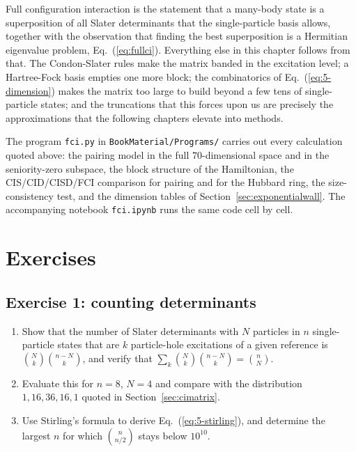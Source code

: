 Full configuration interaction is the statement that a many-body state is a
superposition of all Slater determinants that the single-particle basis
allows, together with the observation that finding the best superposition is a
Hermitian eigenvalue problem, Eq.~(\ref{eq:fullci}).  Everything else in this
chapter follows from that.  The Condon-Slater rules make the matrix banded in
the excitation level; a Hartree-Fock basis empties one more block; the
combinatorics of Eq.~(\ref{eq:5-dimension}) makes the matrix too large to
build beyond a few tens of single-particle states; and the truncations that
this forces upon us are precisely the approximations that the following
chapters elevate into methods.

The program \texttt{fci.py} in \texttt{BookMaterial/Programs/} carries out
every calculation quoted above: the pairing model in the full
$70$-dimensional space and in the seniority-zero subspace, the block structure
of the Hamiltonian, the CIS/CID/CISD/FCI comparison for pairing and for the
Hubbard ring, the size-consistency test, and the dimension tables of
Section~\ref{sec:exponentialwall}.  The accompanying notebook
\texttt{fci.ipynb} runs the same code cell by cell.

\section{Exercises}
\label{sec:ch5exercises}

\subsection*{Exercise 1: counting determinants}
\label{ex:5-counting}

\begin{enumerate}
  \item[a)] Show that the number of Slater determinants with $N$ particles in
  $n$ single-particle states that are $k$ particle-hole excitations of a given
  reference is $\binom{N}{k}\binom{n-N}{k}$, and verify that
  $\sum_k\binom{N}{k}\binom{n-N}{k}=\binom{n}{N}$.
  \item[b)] Evaluate this for $n=8$, $N=4$ and compare with the distribution
  $1,16,36,16,1$ quoted in Section~\ref{sec:cimatrix}.
  \item[c)] Use Stirling's formula to derive Eq.~(\ref{eq:5-stirling}), and
  determine the largest $n$ for which $\binom{n}{n/2}$ stays below $10^{10}$.
\end{enumerate}


